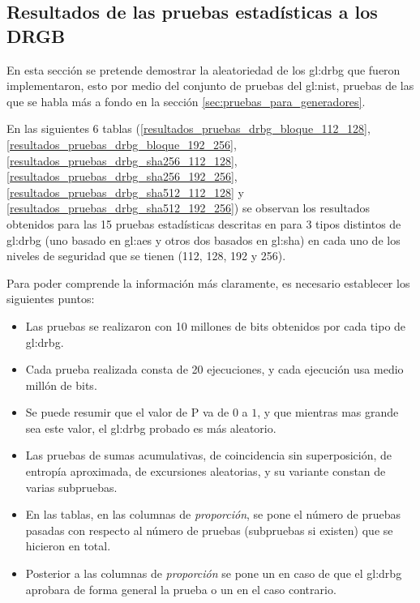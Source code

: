 %
%

\subsection{Resultados de las pruebas estadísticas a los DRGB}
\label{sec:resultados_pruebas_estadisticas_drgb}

En esta sección se pretende demostrar la aleatoriedad de los \gls{gl:drbg}
que fueron implementaron, esto por medio del conjunto de pruebas del
\gls{gl:nist}, pruebas de las que se habla más a fondo en la sección
\ref{sec:pruebas_para_generadores}.

En las siguientes 6 tablas
(\ref{resultados_pruebas_drbg_bloque_112_128},
\ref{resultados_pruebas_drbg_bloque_192_256},
\ref{resultados_pruebas_drbg_sha256_112_128},
\ref{resultados_pruebas_drbg_sha256_192_256},
\ref{resultados_pruebas_drbg_sha512_112_128} y
\ref{resultados_pruebas_drbg_sha512_192_256})
se observan los resultados obtenidos para las 15 pruebas estadísticas
descritas en \cite{nist_pruebas} para 3 tipos distintos de \gls{gl:drbg}
(uno basado en \gls{gl:aes} y otros dos basados en \gls{gl:sha}) en cada
uno de los niveles de seguridad que se tienen (112, 128, 192 y 256).

Para poder comprende la información más claramente, es necesario establecer
los siguientes puntos:

\begin{itemize}

  \item Las pruebas se realizaron con 10 millones de bits obtenidos por cada
    tipo de \gls{gl:drbg}.

  \item Cada prueba realizada consta de 20 ejecuciones, y cada ejecución usa
    medio millón de bits.

  \item Se puede resumir que el valor de P va de $0$ a $1$, y que mientras
    mas grande sea este valor, el \gls{gl:drbg} probado es más aleatorio.

  \item Las pruebas de sumas acumulativas, de coincidencia sin superposición,
    de entropía aproximada, de excursiones aleatorias, y su variante constan
    de varias subpruebas.

  \item En las tablas, en las columnas de \textit{proporción}, se pone el
    número de pruebas pasadas con respecto al número de pruebas (subpruebas
    si existen) que se hicieron en total.

  \item Posterior a las columnas de \textit{proporción} se pone un 
    en caso de que el \gls{gl:drbg} aprobara de forma general la prueba o un
     en el caso contrario.

\end{itemize}

